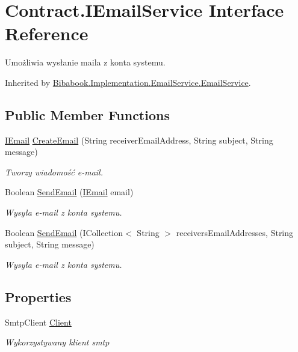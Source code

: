 \hypertarget{interface_contract_1_1_i_email_service}{}\section{Contract.\+I\+Email\+Service Interface Reference}
\label{interface_contract_1_1_i_email_service}


Umożliwia wysłanie maila z konta systemu.  




Inherited by \hyperlink{class_bibabook_1_1_implementation_1_1_email_service_1_1_email_service}{Bibabook.\+Implementation.\+Email\+Service.\+Email\+Service}.

\subsection*{Public Member Functions}
\begin{DoxyCompactItemize}
\item 
\hyperlink{interface_contract_1_1_i_email}{I\+Email} \hyperlink{interface_contract_1_1_i_email_service_ac27044f09d3a6e499f54ac0fcefef31e}{Create\+Email} (String receiver\+Email\+Address, String subject, String message)
\begin{DoxyCompactList}\small\item\em Tworzy wiadomość e-\/mail. \end{DoxyCompactList}\item 
Boolean \hyperlink{interface_contract_1_1_i_email_service_aa4cd47c61363f21b7d8011779439564e}{Send\+Email} (\hyperlink{interface_contract_1_1_i_email}{I\+Email} email)
\begin{DoxyCompactList}\small\item\em Wysyła e-\/mail z konta systemu. \end{DoxyCompactList}\item 
Boolean \hyperlink{interface_contract_1_1_i_email_service_a572c401d8cf8fe1e85abd84e8c8df819}{Send\+Email} (I\+Collection$<$ String $>$ receivers\+Email\+Addresses, String subject, String message)
\begin{DoxyCompactList}\small\item\em Wysyła e-\/mail z konta systemu. \end{DoxyCompactList}\end{DoxyCompactItemize}
\subsection*{Properties}
\begin{DoxyCompactItemize}
\item 
Smtp\+Client \hyperlink{interface_contract_1_1_i_email_service_a251967a7317f40696e5ffbecd71ca93b}{Client}
\begin{DoxyCompactList}\small\item\em Wykorzystywany klient smtp \end{DoxyCompactList}\end{DoxyCompactItemize}


